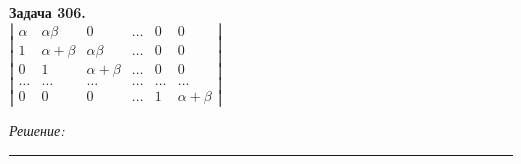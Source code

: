 \documentclass[a4paper, 12pt]{article}
\newenvironment{problem}[2][Задача]
{ \begin{mdframed}[backgroundcolor=gray!10] \textbf{#1 #2.} \\}
	{  \end{mdframed}}
\newenvironment{solution}
{\textit{Решение:}\vspace{.1cm}\\}
{\vspace{.1cm}\noindent\rule{7in}{1.5pt}}
\begin{document}
\begin{problem}{306}
$\left| \begin{array}{cccccc}\alpha & \alpha\beta & 0 & \ldots & 0 & 0 \\ 1 & \alpha+\beta & \alpha\beta & \ldots & 0 &  0 \\ 0 & 1 & \alpha+\beta & \ldots & 0 & 0 \\ \ldots & \ldots & \ldots & \ldots & \ldots & \ldots \\ 0 & 0 & 0 & \ldots & 1 & \alpha+\beta \end{array} \right|$
\end{problem}
\begin{solution}


\end{solution} 
\end{document}
